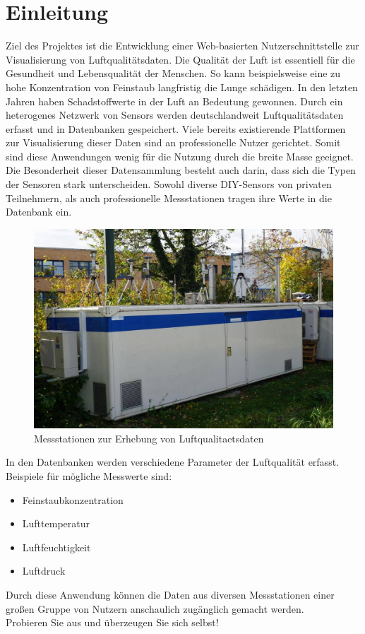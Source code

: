 \section{Einleitung}

Ziel des Projektes ist die Entwicklung einer Web-basierten Nutzerschnittstelle zur Visualisierung von Luftqualitätsdaten.
Die Qualität der Luft ist essentiell für die Gesundheit und Lebensqualität der Menschen. So kann beispielsweise eine zu hohe Konzentration von Feinstaub langfristig die Lunge schädigen. 
In den letzten Jahren haben Schadstoffwerte in der Luft an Bedeutung gewonnen.
Durch ein heterogenes Netzwerk von \glspl{Sensor} werden deutschlandweit Luftqualitätsdaten erfasst und in Datenbanken gespeichert.
Viele bereits existierende Plattformen zur Visualisierung dieser Daten sind an professionelle Nutzer gerichtet. Somit sind diese Anwendungen wenig für die Nutzung durch die breite Masse geeignet.
\\
Die Besonderheit dieser Datensammlung besteht auch darin, dass sich die Typen der Sensoren stark unterscheiden. Sowohl diverse \gls{DIY}-\glspl{Sensor} von privaten Teilnehmern, als auch professionelle Messstationen tragen ihre Werte in die Datenbank ein. 
\\
\begin{figure}[h]
    \centering
    \includegraphics[scale=0.25] {media/Sensor.JPG}
    \caption{Messstationen zur Erhebung von \gls{Luftqualitaetsdaten}}
\end{figure}
In den Datenbanken werden verschiedene Parameter der Luftqualität erfasst. Beispiele für mögliche Messwerte sind:
\begin{itemize} [noitemsep]
    \item \gls{Feinstaub}konzentration
    \item Lufttemperatur
    \item Luftfeuchtigkeit
    \item Luftdruck
\end{itemize}
Durch diese Anwendung können die Daten aus diversen Messstationen einer großen Gruppe von Nutzern anschaulich zugänglich gemacht werden.\\
Probieren Sie \softwarename aus und überzeugen Sie sich selbst!